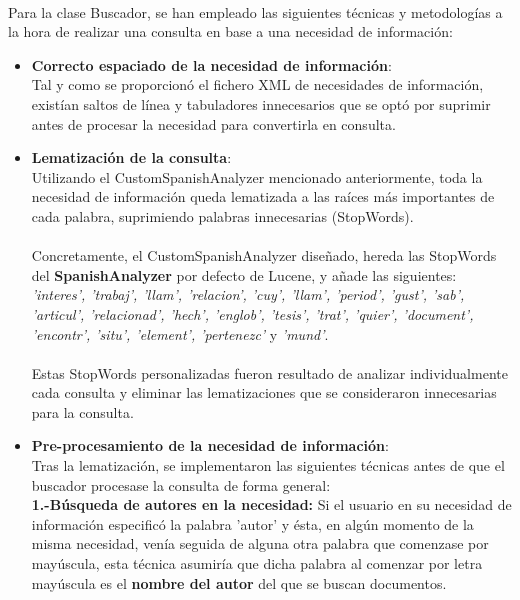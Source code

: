 \documentclass[a4paper]{article}
\begin{document}
\paragraph{}Para la clase Buscador, se han empleado las siguientes técnicas y metodologías a la hora de realizar una consulta en base a una necesidad de información:
\begin{itemize}
	\item \textbf{Correcto espaciado de la necesidad de información}:
	\\ Tal y como se proporcionó el fichero XML de necesidades de información, existían saltos de línea y tabuladores innecesarios que se optó por suprimir antes de procesar la necesidad para convertirla en consulta. 
	\item \textbf{Lematización de la consulta}:
	\\ Utilizando el CustomSpanishAnalyzer mencionado anteriormente, toda la necesidad de información queda lematizada a las raíces más importantes de cada palabra, suprimiendo palabras innecesarias (StopWords). 
	\paragraph{}Concretamente, el CustomSpanishAnalyzer diseñado, hereda las StopWords del \textbf{SpanishAnalyzer} por defecto de Lucene, y añade las siguientes: \textit{'interes', 'trabaj', 'llam', 'relacion', 'cuy', 'llam', 'period', 'gust', 'sab', 'articul', 'relacionad', 'hech', 'englob', 'tesis', 'trat', 'quier', 'document', 'encontr', 'situ', 'element', 'pertenezc'} y \textit{'mund'}.
	\paragraph{}Estas StopWords personalizadas fueron resultado de analizar individualmente cada consulta y eliminar las lematizaciones que se consideraron innecesarias para la consulta.
	\item \textbf{Pre-procesamiento de la necesidad de información}:
	\\Tras la lematización, se implementaron las siguientes técnicas antes de que el buscador procesase la consulta de forma general:
	\\
	\newline \textbf{1.-Búsqueda de autores en la necesidad:} Si el usuario en su necesidad de información especificó la palabra 'autor' y ésta, en algún momento de la misma necesidad, venía seguida de alguna otra palabra que comenzase por mayúscula, esta técnica asumiría que dicha palabra al comenzar por letra mayúscula es el \textbf{nombre del autor} del que se buscan documentos.

\end{itemize}
\end{document}
